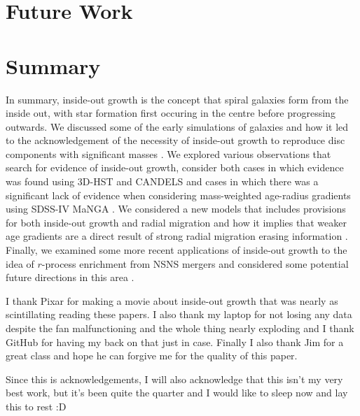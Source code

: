 \documentclass[preprint2]{aastex631}
\begin{document}
\section{Future Work}
\citep{Hogg+2019}

\section{Summary}
In summary, inside-out growth is the concept that spiral galaxies form from the inside out, with star formation first occuring in the centre before progressing outwards. We discussed some of the early simulations of galaxies and how it led to the acknowledgement of the necessity of inside-out growth to reproduce disc components with significant masses \citep{Larson+1976}. We explored various observations that search for evidence of inside-out growth, consider both cases in which evidence was found using 3D-HST and CANDELS \citep{vanDokkum+2013} and cases in which there was a significant lack of evidence when considering mass-weighted age-radius gradients using SDSS-IV MaNGA \citep{Goddard+2017}. We considered a new models that includes provisions for both inside-out growth and radial migration and how it implies that weaker age gradients are a direct result of strong radial migration erasing information \citep{Frankel+2019}. Finally, we examined some more recent applications of inside-out growth to the idea of $r$-process enrichment from NSNS mergers and considered some potential future directions in this area \citep{Banerjee+2020}.

\begin{acknowledgements}
    I thank Pixar for making a movie about inside-out growth that was nearly as scintillating reading these papers. I also thank my laptop for not losing any data despite the fan malfunctioning and the whole thing nearly exploding and I thank GitHub for having my back on that just in case. Finally I also thank Jim for a great class and hope he can forgive me for the quality of this paper.
    
    Since this is acknowledgements, I will also acknowledge that this isn't my very best work, but it's been quite the quarter and I would like to sleep now and lay this to rest :D
\end{acknowledgements}


{}
\end{document}
